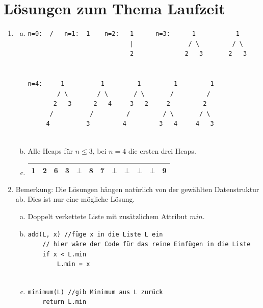 \documentclass{scrartcl}
\begin{document}
\TabPositions{0.8cm, 1.6cm, 2.4cm, 3.2cm}

\section*{Lösungen zum Thema Laufzeit}
\begin{enumerate}[(1)]

\item \begin{enumerate}[(a)]
\item
\begin{verbatim}
n=0:  /   n=1:  1    n=2:   1      n=3:      1           1
                            |               / \         / \
                            2              2   3       2   3
                            

n=4:     1          1         1         1         1
        / \        / \       / \       /         /  
       2   3      2   4     3   2     2         2
      /          /         /         / \       / \
     4          3         4         3   4     4   3
     
\end{verbatim}
\item Alle Heaps f\"ur $n\leq 3$, bei $n=4$ die ersten drei Heaps.
\item \begin{tabular}{|c|c|c|c|c|c|c|c|c|c|c|c|}
\hline
1 & 2 & 6 & 3 & $\bot$ & 8 & 7 & $\bot$ & $\bot$ & $\bot$ & $\bot$ & 9 \\ \hline
\end{tabular}
\end{enumerate}

\item 
Bemerkung: Die L\"osungen h\"angen nat\"urlich von der gew\"ahlten Datenstruktur ab. Dies ist nur eine m\"ogliche L\"osung.
\begin{enumerate}[(a)]
\item Doppelt verkettete Liste mit zus\"atzlichem Attribut $min$.
\item
\begin{verbatim}
add(L, x) //füge x in die Liste L ein
    // hier wäre der Code für das reine Einfügen in die Liste
    if x < L.min
    	L.min = x
    	
\end{verbatim}
\item
\begin{verbatim}
minimum(L) //gib Minimum aus L zurück
    return L.min
    	

\end{verbatim}
\end{enumerate}
\end{enumerate}
\end{document}
